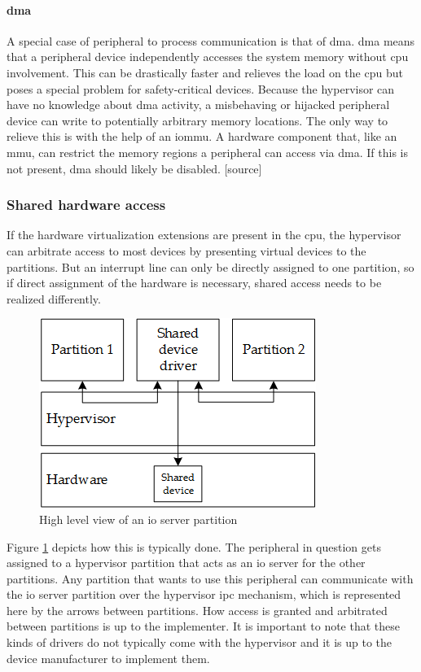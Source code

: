 \paragraph{\acrshort{dma}}
A special case of peripheral to process communication is that of \acrfull{dma}. \acrshort{dma} means that a peripheral device independently accesses the system memory without \acrshort{cpu} involvement. This can be drastically faster and relieves the load on the \acrshort{cpu} but poses a special problem for safety-critical devices. Because the hypervisor can have no knowledge about \acrshort{dma} activity, a misbehaving or hijacked peripheral device can write to potentially arbitrary memory locations. The only way to relieve this is with the help of an \acrfull{iommu}. A hardware component that, like an \acrshort{mmu}, can restrict the memory regions a peripheral can access via \acrshort{dma}.
If this is not present, \acrshort{dma} should likely be disabled. [source]

\subsubsection{Shared hardware access}
If the hardware virtualization extensions are present in the \acrshort{cpu}, the hypervisor can arbitrate access to most devices by presenting virtual devices to the partitions.
But an interrupt line can only be directly assigned to one partition, so if direct assignment of the hardware is necessary, shared access needs to be realized differently. 

\begin{figure}[hbt!]
\centering
\includegraphics[scale=1]{Figures/shared_driver.png}
\decoRule
\caption{High level view of an \acrshort{io} server partition}
\label{fig:shared_driver}
\end{figure}
Figure \ref{fig:shared_driver} depicts how this is typically done. The peripheral in question gets assigned to a hypervisor partition that acts as an \acrshort{io} server for the other partitions. Any partition that wants to use this peripheral can communicate with the \acrshort{io} server partition over the hypervisor \acrshort{ipc} mechanism, which is represented here by the arrows between partitions. How access is granted and arbitrated between partitions is up to the implementer. It is important to note that these kinds of drivers do not typically come with the hypervisor and it is up to the device manufacturer to implement them.

